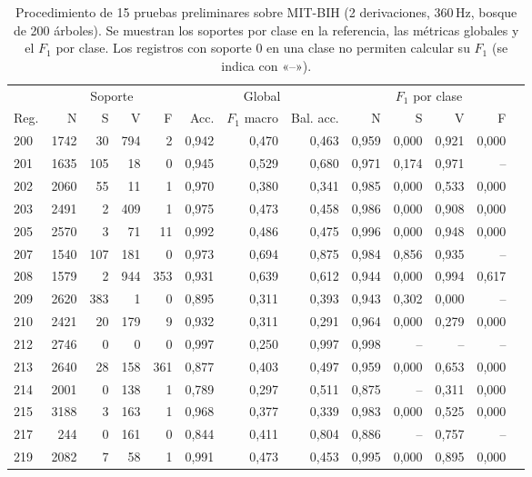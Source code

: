 \begin{table}[t]
\centering\footnotesize
\caption{Procedimiento de 15 pruebas preliminares sobre MIT-BIH (2
derivaciones, 360\,Hz, bosque de 200 árboles). Se muestran los soportes
por clase en la referencia, las métricas globales y el $F_1$ por clase.
Los registros con soporte 0 en una clase no permiten calcular su
$F_1$ (se indica con «--»).}
\label{tab:campana}
\begin{tabular}{@{}lrrrrrrrrrrrr@{}}
\toprule
 & \multicolumn{4}{c}{Soporte} & \multicolumn{3}{c}{Global} & \multicolumn{4}{c}{$F_1$ por clase}\\
\cmidrule(lr){2-5}\cmidrule(lr){6-8}\cmidrule(lr){9-12}
Reg. & N & S & V & F & Acc. & $F_1$ macro & Bal. acc. & N & S & V & F\\
\midrule
200 & 1742 & 30 & 794 & 2 & 0,942 & 0,470 & 0,463 & 0,959 & 0,000 & 0,921 & 0,000\\
201 & 1635 & 105 & 18 & 0 & 0,945 & 0,529 & 0,680 & 0,971 & 0,174 & 0,971 & --\\
202 & 2060 & 55 & 11 & 1 & 0,970 & 0,380 & 0,341 & 0,985 & 0,000 & 0,533 & 0,000\\
203 & 2491 & 2 & 409 & 1 & 0,975 & 0,473 & 0,458 & 0,986 & 0,000 & 0,908 & 0,000\\
205 & 2570 & 3 & 71 & 11 & 0,992 & 0,486 & 0,475 & 0,996 & 0,000 & 0,948 & 0,000\\
207 & 1540 & 107 & 181 & 0 & 0,973 & 0,694 & 0,875 & 0,984 & 0,856 & 0,935 & --\\
208 & 1579 & 2 & 944 & 353 & 0,931 & 0,639 & 0,612 & 0,944 & 0,000 & 0,994 & 0,617\\
209 & 2620 & 383 & 1 & 0 & 0,895 & 0,311 & 0,393 & 0,943 & 0,302 & 0,000 & --\\
210 & 2421 & 20 & 179 & 9 & 0,932 & 0,311 & 0,291 & 0,964 & 0,000 & 0,279 & 0,000\\
212 & 2746 & 0 & 0 & 0 & 0,997 & 0,250 & 0,997 & 0,998 & -- & -- & --\\
213 & 2640 & 28 & 158 & 361 & 0,877 & 0,403 & 0,497 & 0,959 & 0,000 & 0,653 & 0,000\\
214 & 2001 & 0 & 138 & 1 & 0,789 & 0,297 & 0,511 & 0,875 & -- & 0,311 & 0,000\\
215 & 3188 & 3 & 163 & 1 & 0,968 & 0,377 & 0,339 & 0,983 & 0,000 & 0,525 & 0,000\\
217 & 244 & 0 & 161 & 0 & 0,844 & 0,411 & 0,804 & 0,886 & -- & 0,757 & --\\
219 & 2082 & 7 & 58 & 1 & 0,991 & 0,473 & 0,453 & 0,995 & 0,000 & 0,895 & 0,000\\
\bottomrule
\end{tabular}
\end{table}

